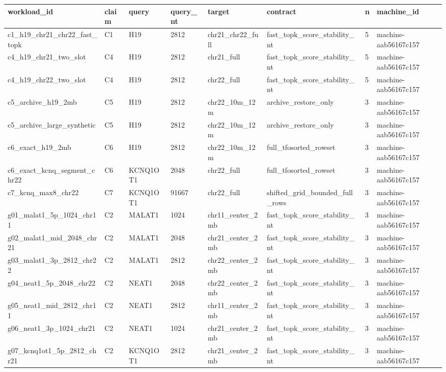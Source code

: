 \begin{tabular}{llllllll}
\toprule
workload\_id & claim & query & query\_nt & target & contract & n & machine\_id \\
\midrule
c1\_h19\_chr21\_chr22\_fast\_topk & C1 & H19 & 2812 & chr21\_chr22\_full & fast\_topk\_score\_stability\_nt & 5 & machine-aab56167c157 \\
c4\_h19\_chr21\_two\_slot & C4 & H19 & 2812 & chr21\_full & fast\_topk\_score\_stability\_nt & 5 & machine-aab56167c157 \\
c4\_h19\_chr22\_two\_slot & C4 & H19 & 2812 & chr22\_full & fast\_topk\_score\_stability\_nt & 5 & machine-aab56167c157 \\
c5\_archive\_h19\_2mb & C5 & H19 & 2812 & chr22\_10m\_12m & archive\_restore\_only & 3 & machine-aab56167c157 \\
c5\_archive\_large\_synthetic & C5 & H19 & 2812 & chr22\_10m\_12m & archive\_restore\_only & 3 & machine-aab56167c157 \\
c6\_exact\_h19\_2mb & C6 & H19 & 2812 & chr22\_10m\_12m & full\_tfosorted\_rowset & 3 & machine-aab56167c157 \\
c6\_exact\_kcnq\_segment\_chr22 & C6 & KCNQ1OT1 & 2048 & chr22\_full & full\_tfosorted\_rowset & 3 & machine-aab56167c157 \\
c7\_kcnq\_max8\_chr22 & C7 & KCNQ1OT1 & 91667 & chr22\_full & shifted\_grid\_bounded\_full\_rows & 3 & machine-aab56167c157 \\
g01\_malat1\_5p\_1024\_chr11 & C2 & MALAT1 & 1024 & chr11\_center\_2mb & fast\_topk\_score\_stability\_nt & 3 & machine-aab56167c157 \\
g02\_malat1\_mid\_2048\_chr21 & C2 & MALAT1 & 2048 & chr21\_center\_2mb & fast\_topk\_score\_stability\_nt & 3 & machine-aab56167c157 \\
g03\_malat1\_3p\_2812\_chr22 & C2 & MALAT1 & 2812 & chr22\_center\_2mb & fast\_topk\_score\_stability\_nt & 3 & machine-aab56167c157 \\
g04\_neat1\_5p\_2048\_chr22 & C2 & NEAT1 & 2048 & chr22\_center\_2mb & fast\_topk\_score\_stability\_nt & 3 & machine-aab56167c157 \\
g05\_neat1\_mid\_2812\_chr11 & C2 & NEAT1 & 2812 & chr11\_center\_2mb & fast\_topk\_score\_stability\_nt & 3 & machine-aab56167c157 \\
g06\_neat1\_3p\_1024\_chr21 & C2 & NEAT1 & 1024 & chr21\_center\_2mb & fast\_topk\_score\_stability\_nt & 3 & machine-aab56167c157 \\
g07\_kcnq1ot1\_5p\_2812\_chr21 & C2 & KCNQ1OT1 & 2812 & chr21\_center\_2mb & fast\_topk\_score\_stability\_nt & 3 & machine-aab56167c157 \\

\end{tabular}
